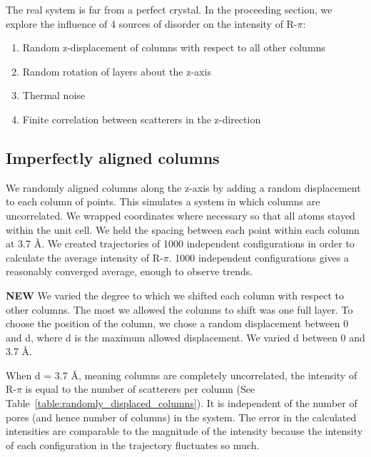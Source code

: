 \documentclass{article}
\begin{document}
  The real system is far from a perfect crystal. In the proceeding section, we
  explore the influence of 4 sources of disorder on the intensity of R-$\pi$:
  \begin{enumerate}
  \item Random z-displacement of columns with respect to all other columns
  \item Random rotation of layers about the z-axis
  \item Thermal noise
  \item Finite correlation between scatterers in the z-direction
  \end{enumerate}

  \subsection{Imperfectly aligned columns}

  We randomly aligned columns along the z-axis by adding a random displacement
  to each column of points. This simulates a system in which columns are
  uncorrelated.  We wrapped coordinates where necessary so that all atoms stayed
  within the unit cell. We held the spacing between each point within each column
  at 3.7 \AA. We created trajectories of 1000 independent
  configurations in order to calculate the average intensity of R-$\pi$. 1000
  independent configurations gives a reasonably converged average, enough to
  observe trends.
 
  \textbf{NEW} We varied the degree to which we shifted each column with
  respect to other columns. The most we allowed the columns to shift was one full
  layer. To choose the position of the column, we chose a random displacement
  between 0 and d, where d is the maximum allowed displacement. We varied d
  between 0 and 3.7 \AA.  

  When d = 3.7 \AA, meaning columns are completely uncorrelated, the intensity
  of R-$\pi$ is equal to the number of scatterers per column (See
  Table~\ref{table:randomly_displaced_columns}).  It is independent of the number
  of pores (and hence number of columns) in the system. The error in the
  calculated intensities are comparable to the magnitude of the intensity because
  the intensity of each configuration in the trajectory fluctuates so much. 
\end{document}
